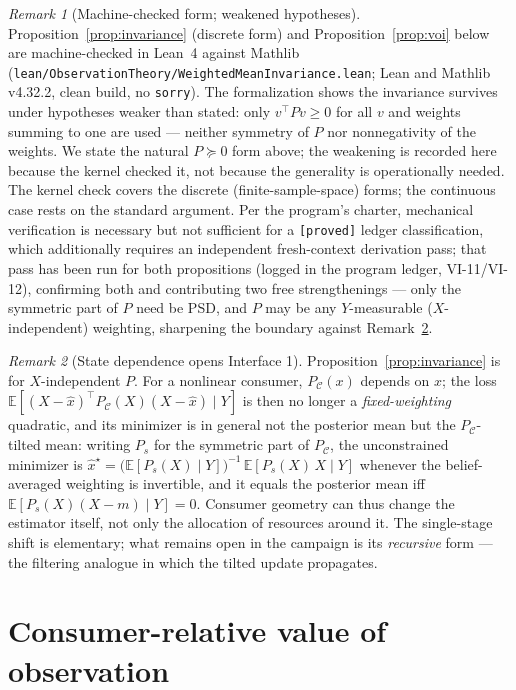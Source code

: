 \documentclass{article}
\theoremstyle{definition}
\theoremstyle{remark}
\newtheorem{remark}{Remark}
\newcommand{\E}{\mathbb{E}}
\newcommand{\PC}{P_{\mathcal{C}}}
\begin{document}
\begin{remark}[Machine-checked form; weakened hypotheses]
\label{rem:kernel}
Proposition~\ref{prop:invariance} (discrete form) and
Proposition~\ref{prop:voi} below are machine-checked in Lean~4 against
Mathlib (\texttt{lean/ObservationTheory/WeightedMeanInvariance.lean}; Lean
and Mathlib v4.32.2, clean build, no \texttt{sorry}). The formalization shows
the invariance survives under hypotheses weaker than stated: only
$v^{\top}Pv\ge 0$ for all $v$ and weights summing to one are used --- neither
symmetry of $P$ nor nonnegativity of the weights. We state the natural
$P\succeq 0$ form above; the weakening is recorded here because the kernel
checked it, not because the generality is operationally needed. The kernel
check covers the discrete (finite-sample-space) forms; the continuous case
rests on the standard argument. Per the program's charter, mechanical
verification is necessary but not sufficient for a \texttt{[proved]} ledger
classification, which additionally requires an independent fresh-context
derivation pass; that pass has been run for both propositions (logged in
the program ledger, VI-11/VI-12), confirming both and contributing two free
strengthenings --- only the symmetric part of $P$ need be PSD, and $P$ may
be any $Y$-measurable ($X$-independent) weighting, sharpening the boundary
against Remark~\ref{rem:statedep}.
\end{remark}

\begin{remark}[State dependence opens Interface 1]
\label{rem:statedep}
Proposition~\ref{prop:invariance} is for $X$-independent $P$. For a
nonlinear consumer, $\PC(x)$ depends on $x$; the loss
$\E[(X-\hat x)^{\top}\PC(X)(X-\hat x)\mid Y]$ is then no longer a
\emph{fixed-weighting} quadratic, and its minimizer is in general not the
posterior mean but the $\PC$-tilted mean: writing $P_s$ for the symmetric
part of $\PC$, the unconstrained minimizer is
$\hat x^{\star}=\big(\E[P_s(X)\mid Y]\big)^{-1}\,\E[P_s(X)\,X\mid Y]$
whenever the belief-averaged weighting is invertible, and it equals the
posterior mean iff $\E[P_s(X)(X-m)\mid Y]=0$. Consumer geometry can thus
change the estimator itself, not only the allocation of resources around
it. The single-stage shift is elementary; what remains open in the
campaign is its \emph{recursive} form --- the filtering analogue in which
the tilted update propagates.
\end{remark}

\section{Consumer-relative value of observation}
\label{sec:voi}
\end{document}
